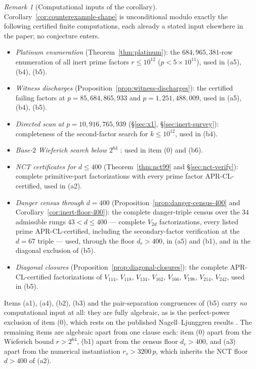 \documentclass[11pt]{amsart}
\theoremstyle{plain}
\theoremstyle{definition}
\theoremstyle{remark}
\newtheorem{remark}[theorem]{Remark}
\numberwithin{equation}{section}
\begin{document}
\begin{remark}[Computational inputs of the corollary]\label{rem:shape-inputs}
Corollary~\ref{cor:counterexample-shape} is unconditional modulo exactly
the following certified finite computations, each already a stated input
elsewhere in the paper; no conjecture enters.
\begin{itemize}
\item \emph{Platinum enumeration} (Theorem~\ref{thm:platinum}): the
$684{,}965{,}381$-row enumeration of all inert prime factors
$r \leq 10^{12}$ ($p < 5 \times 10^{11}$), used in (a5), (b4), (b5).
\item \emph{Witness discharges}
(Proposition~\ref{prop:witness-discharges}): the certified failing
factors at $p = 85{,}684{,}865{,}933$ and $p = 1{,}251{,}488{,}009$,
used in (a5), (b4), (b5).
\item \emph{Directed scan at $p = 10{,}916{,}765{,}939$}
(\S\ref{sec:x1}, \S\ref{sec:inert-survey}): completeness of the
second-factor search for $k \leq 10^{12}$, used in (b4).
\item \emph{Base-$2$ Wieferich search below $2^{64}$}
\cite{ref:OEISWieferich}: used in item (0) and (b6).
\item \emph{NCT certificates for $d \leq 400$}
(Theorem~\ref{thm:nct99} and \S\ref{sec:nct-verify}): complete
primitive-part factorizations with every prime factor APR-CL-certified,
used in (a2).
\item \emph{Danger census through $d = 400$}
(Proposition~\ref{prop:danger-census-400} and
Corollary~\ref{cor:inert-floor-400}): the complete danger-triple census
over the $34$ admissible rungs $43 < d \leq 400$ --- complete $V_{2d}$
factorizations, every listed prime APR-CL-certified, including the
secondary-factor verification at the $d = 67$ triple --- used, through
the floor $d_r > 400$, in (a5) and (b1), and in the diagonal exclusion
of (b5).
\item \emph{Diagonal closures} (Proposition~\ref{prop:diagonal-closures}):
the complete APR-CL-certified factorizations of $V_{114}$, $V_{118}$,
$V_{134}$, $V_{162}$, $V_{166}$, $V_{198}$, $V_{214}$, $V_{242}$, used
in (b5).
\end{itemize}
Items (a1), (a4), (b2), (b3) and the pair-separation congruences of
(b5) carry \emph{no} computational input at all: they are fully
algebraic, as is the perfect-power exclusion of item (0), which rests on
the published Nagell--Ljunggren results \cite{ref:BennettLevin,
ref:BugeaudMignotte2002, ref:BugeaudCaoMignotte2001}. The remaining
items are algebraic apart from one clause each: item (0) apart from the
Wieferich bound $r > 2^{64}$, (b1) apart from the census floor
$d_r > 400$, and (a3) apart from the numerical instantiation
$r_s > 3200\,p$, which inherits the NCT floor $d > 400$ of (a2).
\end{remark}
\end{document}
